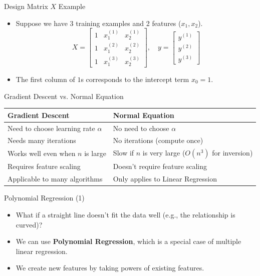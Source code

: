 \documentclass[aspectratio=169]{beamer}
\begin{document}
\begin{frame}{Design Matrix $X$ Example}
\begin{itemize}
    \item Suppose we have 3 training examples and 2 features ($x_1, x_2$).
    $$ X = \begin{bmatrix}
    1 & x_1^{(1)} & x_2^{(1)} \\
    1 & x_1^{(2)} & x_2^{(2)} \\
    1 & x_1^{(3)} & x_2^{(3)}
    \end{bmatrix}, \quad
    y = \begin{bmatrix}
    y^{(1)} \\ y^{(2)} \\ y^{(3)}
    \end{bmatrix} $$
    \item The first column of $1$s corresponds to the intercept term $x_0 = 1$.
\end{itemize}
\end{frame}

\begin{frame}{Gradient Descent vs. Normal Equation}
\begin{table}
\centering
\small
\begin{tabular}{|p{}|p{}|}
\hline
\textbf{Gradient Descent} & \textbf{Normal Equation} \\
\hline
Need to choose learning rate $\alpha$ & No need to choose $\alpha$ \\
Needs many iterations & No iterations (compute once) \\
Works well even when $n$ is large & Slow if $n$ is very large ($O(n^3)$ for inversion) \\
Requires feature scaling & Doesn't require feature scaling \\
Applicable to many algorithms & Only applies to Linear Regression \\
\hline
\end{tabular}
\end{table}
\end{frame}

\begin{frame}{Polynomial Regression (1)}
\begin{itemize}
    \item What if a straight line doesn't fit the data well (e.g., the relationship is curved)?
    \item We can use \textbf{Polynomial Regression}, which is a special case of multiple linear regression.
    \item We create new features by taking powers of existing features.
\end{itemize}
\end{frame}
\end{document}
